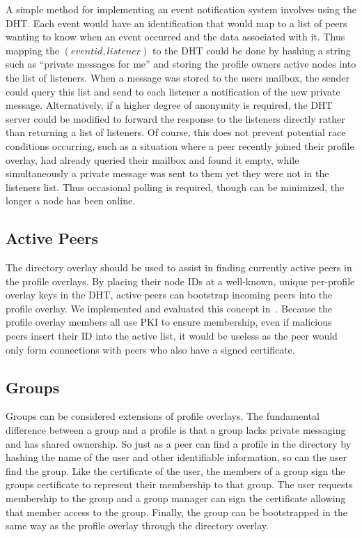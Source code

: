 \documentclass[conference]{IEEEtran}
\begin{document}
A simple method for implementing an event notification system involves using
the DHT.  Each event would have an identification that would map to a list of
peers wanting to know when an event occurred and the data associated with it.
Thus mapping the $(event id, listener)$ to the DHT could be done by hashing a
string such as ``private messages for me'' and storing the profile owners
active nodes into the list of listeners.  When a message was stored to the
users mailbox, the sender could query this list and send to each listener a
notification of the new private message.  Alternatively, if a higher degree of
anonymity is required, the DHT server could be modified to forward the
response to the listeners directly rather than returning a list of listeners.
Of course, this does not prevent potential race conditions occurring, such as
a situation where a peer recently joined their profile overlay, had already
queried their mailbox and found it empty, while simultaneously a private
message was sent to them yet they were not in the listeners list.  Thus
occasional polling is required, though can be minimized, the longer a node
has been online.

\subsection{Active Peers}

The directory overlay should be used to assist in finding currently active
peers in the profile overlays.  By placing their node IDs at a well-known,
unique per-profile overlay keys in the DHT, active peers can bootstrap
incoming peers into the profile overlay.  We implemented and evaluated this
concept in~\cite{vpo}.  Because the profile overlay members all use PKI to
ensure membership, even if malicious peers insert their ID into the active
list, it would be useless as the peer would only form connections with peers
who also have a signed certificate.

\subsection{Groups}

Groups can be considered extensions of profile overlays.  The fundamental
difference between a group and a profile is that a group lacks private
messaging and has shared ownership.  So just as a peer can find a profile in
the directory by hashing the name of the user and other identifiable
information, so can the user find the group.  Like the certificate of the
user, the members of a group sign the groups certificate to represent their
membership to that group.  The user requests membership to the group and a
group manager can sign the certificate allowing that member access to the
group.  Finally, the group can be bootstrapped in the same way as the profile
overlay through the directory overlay.
\end{document}
